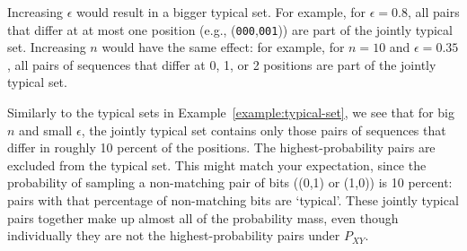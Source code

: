 \begin{example}
Increasing $\epsilon$ would result in a bigger typical set. For example, for $\epsilon = 0.8$, all pairs that differ at at most one position (e.g., (\texttt{000},\texttt{001})) are part of the jointly typical set. Increasing $n$ would have the same effect: for example, for $n = 10$ and $\epsilon = 0.35$, all pairs of sequences that differ at 0, 1, or 2 positions are part of the jointly typical set.

Similarly to the typical sets in Example~\ref{example:typical-set}, we see that for big $n$ and small $\epsilon$, the jointly typical set contains only those pairs of sequences that differ in roughly 10 percent of the positions. The highest-probability pairs are excluded from the typical set. This might match your expectation, since the probability of sampling a non-matching pair of bits ((0,1) or (1,0)) is 10 percent: pairs with that percentage of non-matching bits are `typical'. These jointly typical pairs together make up almost all of the probability mass, even though individually they are not the highest-probability pairs under $P_{XY}$.
\end{example}

